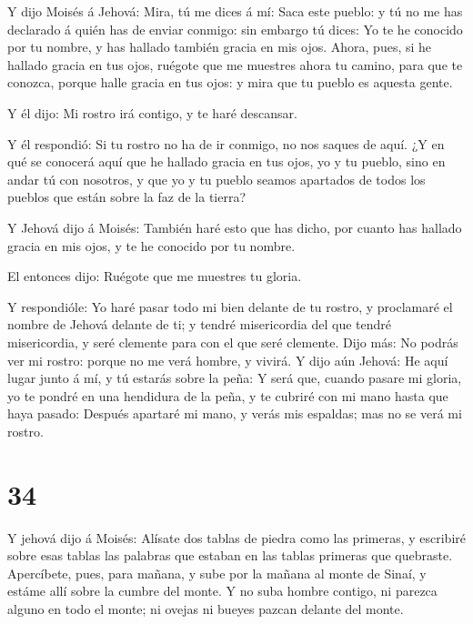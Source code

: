  Y dijo Moisés á Jehová: Mira, tú me dices á mí: Saca este
pueblo: y tú no me has declarado á quién has de enviar conmigo: sin
embargo tú dices: Yo te he conocido por tu nombre, y has hallado también
gracia en mis ojos.  Ahora, pues, si he hallado gracia en
tus ojos, ruégote que me muestres ahora tu camino, para que te conozca,
porque halle gracia en tus ojos: y mira que tu pueblo es aquesta gente.

 Y él dijo: Mi rostro irá contigo, y te haré descansar.

 Y él respondió: Si tu rostro no ha de ir conmigo, no nos
saques de aquí.  ¿Y en qué se conocerá aquí que he hallado
gracia en tus ojos, yo y tu pueblo, sino en andar tú con nosotros, y que
yo y tu pueblo seamos apartados de todos los pueblos que están sobre la
faz de la tierra?

 Y Jehová dijo á Moisés: También haré esto que has dicho,
por cuanto has hallado gracia en mis ojos, y te he conocido por tu
nombre.

 El entonces dijo: Ruégote que me muestres tu gloria.

 Y respondióle: Yo haré pasar todo mi bien delante de tu
rostro, y proclamaré el nombre de Jehová delante de ti; y tendré
misericordia del que tendré misericordia, y seré clemente para con el
que seré clemente.  Dijo más: No podrás ver mi rostro:
porque no me verá hombre, y vivirá.  Y dijo aún Jehová: He
aquí lugar junto á mí, y tú estarás sobre la peña:  Y será
que, cuando pasare mi gloria, yo te pondré en una hendidura de la peña,
y te cubriré con mi mano hasta que haya pasado:  Después
apartaré mi mano, y verás mis espaldas; mas no se verá mi rostro.

\hypertarget{section-33}{%
\section{34}\label{section-33}}

 Y jehová dijo á Moisés: Alísate dos tablas de piedra como
las primeras, y escribiré sobre esas tablas las palabras que estaban en
las tablas primeras que quebraste.  Apercíbete, pues, para
mañana, y sube por la mañana al monte de Sinaí, y estáme allí sobre la
cumbre del monte.  Y no suba hombre contigo, ni parezca
alguno en todo el monte; ni ovejas ni bueyes pazcan delante del monte.

